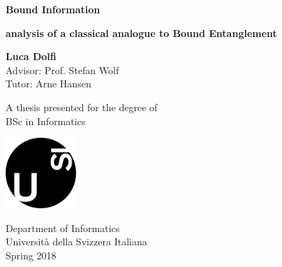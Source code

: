 \begin{titlepage}
    \begin{center}
        \vspace*{1cm}
        
        \Huge
        \textbf{Bound Information}
        
        \vspace{0.5cm}
        \LARGE
        \textbf{analysis of a classical analogue to Bound Entanglement}
        
        \vspace{1.5cm}
        
        \textbf{Luca Dolfi}\\ 
         Advisor: Prof. Stefan Wolf \\ 
         Tutor: Arne Hansen \\
        
        \vfill
        
        A thesis presented for the degree of\\
        BSc in Informatics
        
        \vspace{0.8cm}
        
        \includegraphics[width=0.2\textwidth]{images/usi-immagini-logo-formatted.png}
        
        \Large
        Department of Informatics\\
        Universit\`a della Svizzera Italiana\\
        Spring 2018
        
    \end{center}
\end{titlepage}